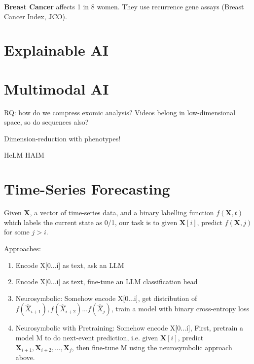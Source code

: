\textbf{Breast Cancer} affects 1 in 8 women. They use recurrence gene assays (Breast Cancer Index, JCO). 



\section{Explainable AI}

\section{Multimodal AI}

RQ: how do we compress exomic analysis? 
Videos belong in low-dimensional space, so do sequences also?

Dimension-reduction with phenotypes! 

HeLM
HAIM 

\section{Time-Series Forecasting}

Given $\mathbf{X}$, a vector of time-series data, and a binary labelling function $f(\mathbf{X}, t)$ which labels the current state as 0/1, our task is to given $\mathbf{X}[i]$, predict $f(\mathbf{X}, j)$ for some $j > i$.

Approaches:
\begin{enumerate}
    \item Encode X[0...i] as text, ask an LLM
    \item Encode X[0...i] as text, fine-tune an LLM classification head
    \item Neurosymbolic: Somehow encode X[0...i], get distribution of $f(\hat{X}_{i+1}), f(\hat{X}_{i+2})...f(\hat{X}_{j})$, train a model with binary cross-entropy loss
    \item Neurosymbolic with Pretraining: Somehow encode X[0...i], First, pretrain a model M to do next-event prediction, i.e. given $\mathbf{X}[i]$, predict $\mathbf{X}_{i+1}, \mathbf{X}_{i+2}, ..., \mathbf{X}_{j}$, then fine-tune M using the neurosymbolic approach above.
\end{enumerate}




